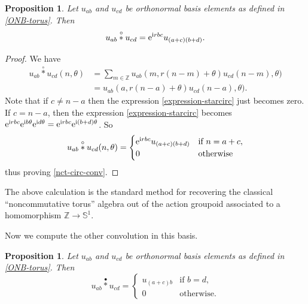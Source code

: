 \documentclass[10pt,a4paper]{amsart}
\numberwithin{equation}{section}
\newtheorem{Proposition}[Theorem]{Proposition}
\theoremstyle{definition}
\newcommand{\BBZ}{\mathbb{Z}}
\newcommand{\BBS}{\mathbb{S}}
\newcommand{\stardot}{\overset{{\bullet}}{*}}
\newcommand{\starcirc}{\overset{\circ}{*}}
\begin{document}
\begin{Proposition}\label{prop:nct.circ.calculation} Let $u_{ab}$ and $u_{cd}$ be orthonormal basis elements as defined in {\rm\eqref{ONB-torus}}. Then
\begin{equation}\label{nct-circ-conv}
u_{ab}\starcirc u_{cd}={\rm e}^{{\rm i} r bc} u_{(a+c)(b+d)}.
\end{equation}
\end{Proposition}

\begin{proof}
We have
\begin{align}
   u_{ab}\starcirc u_{cd}(n,\theta) & = \sum_{m\in \BBZ} u_{ab}(m,r(n-m)+\theta)u_{cd}(n-m),\theta)\nonumber\\
  & = u_{ab}(a,r(n-a)+\theta)u_{cd}(n-a),\theta).\label{expression-starcirc}
\end{align}
Note that if $c\neq n-a$ then the expression \eqref{expression-starcirc} just becomes zero. If $c=n-a$, then the expression \eqref{expression-starcirc} becomes
$
{\rm e}^{{\rm i}rbc}{\rm e}^{{\rm i} b\theta}{\rm e}^{{\rm i} d\theta}={\rm e}^{{\rm i} rbc} {\rm e}^{{\rm i}(b+d)\theta}$.
So
\[
u_{ab}\starcirc u_{cd}(n,\theta)=\begin{cases} {\rm e}^{{\rm i} rbc} u_{(a+c)(b+d)} & \text{if } n=a+c,\\
0 & \text{otherwise}
\end{cases}
\]
thus proving \eqref{nct-circ-conv}.
\end{proof}

The above calculation is the standard method for recovering the classical ``noncommutative torus'' algebra out of the action groupoid associated to a homomorphism $ \BBZ \to \BBS^1 $.

Now we compute the other convolution in this basis.
\begin{Proposition} Let $u_{ab}$ and $u_{cd}$ be orthonormal basis elements as defined in \eqref{ONB-torus}. Then
\begin{equation*}\label{nct-dot-conv}
u_{ab}\stardot u_{cd}=\begin{cases} u_{(a+c)b} & \text{if } b=d,\\
0 & \text{otherwise}.
\end{cases}
\end{equation*}
\end{Proposition}
\end{document}
